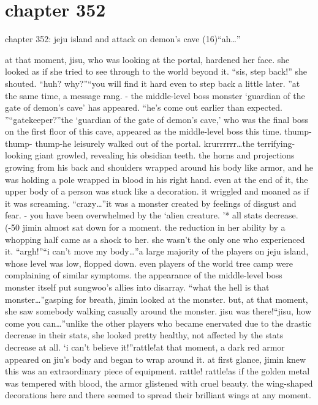 \section{chapter 352}

chapter 352: jeju island and attack on demon’s cave (16)“ah…”




at that moment, jisu, who was looking at the portal, hardened her face.
 she looked as if she tried to see through to the world beyond it.
“sis, step back!” she shouted.
“huh? why?”“you will find it hard even to step back a little later.
”at the same time, a message rang.
- the middle-level boss monster ‘guardian of the gate of demon’s cave’ has appeared.
“he’s come out earlier than expected.
”“gatekeeper?”the ‘guardian of the gate of demon’s cave,’ who was the final boss on the first floor of this cave, appeared as the middle-level boss this time.
thump- thump- thump-he leisurely walked out of the portal.
krurrrrrr…the terrifying-looking giant growled, revealing his obsidian teeth.
the horns and projections growing from his back and shoulders wrapped around his body like armor, and he was holding a pole wrapped in blood in his right hand.
 even at the end of it, the upper body of a person was stuck like a decoration.
 it wriggled and moaned as if it was screaming.
“crazy…”it was a monster created by feelings of disgust and fear.
- you have been overwhelmed by the ‘alien creature.
’* all stats decrease.
 (-50%
jimin almost sat down for a moment.
 the reduction in her ability by a whopping half came as a shock to her.
 she wasn’t the only one who experienced it.
“argh!”“i can’t move my body…”a large majority of the players on jeju island, whose level was low, flopped down.
even players of the world tree camp were complaining of similar symptoms.
 the appearance of the middle-level boss monster itself put sungwoo’s allies into disarray.
“what the hell is that monster…”gasping for breath, jimin looked at the monster.
 but, at that moment, she saw somebody walking casually around the monster.
 jisu was there!“jisu, how come you can…”unlike the other players who became enervated due to the drastic decrease in their stats, she looked pretty healthy, not affected by the stats decrease at all.
‘i can’t believe it!”rattle!at that moment, a dark red armor appeared on jiu’s body and began to wrap around it.
 at first glance, jimin knew this was an extraordinary piece of equipment.
rattle! rattle!as if the golden metal was tempered with blood, the armor glistened with cruel beauty.
the wing-shaped decorations here and there seemed to spread their brilliant wings at any moment.
